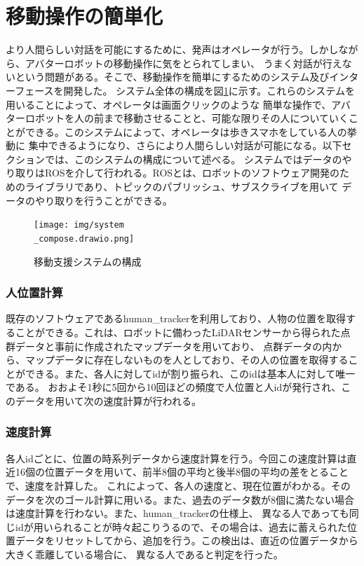 \documentclass[11pt,a4j]{jreport}
\begin{document}
\section{移動操作の簡単化}
より人間らしい対話を可能にするために、発声はオペレータが行う。しかしながら、アバターロボットの移動操作に気をとられてしまい、
うまく対話が行えないという問題がある。そこで、移動操作を簡単にするためのシステム及びインターフェースを開発した。
システム全体の構成を図\ref{pic:systemcompose}に示す。これらのシステムを用いることによって、オペレータは画面クリックのような
簡単な操作で、アバターロボットを人の前まで移動させることと、可能な限りその人についていくことができる。このシステムによって、オペレータは歩きスマホをしている人の挙動に
集中できるようになり、さらにより人間らしい対話が可能になる。以下セクションでは、このシステムの構成について述べる。
システムではデータのやり取りはROSを介して行われる。ROSとは、ロボットのソフトウェア開発のためのライブラリであり、トピックのパブリッシュ、サブスクライブを用いて
データのやり取りを行うことができる。
\begin{figure}[H]
  
  \texttt{[image: img/system\\\_compose.drawio.png]}
  \caption{移動支援システムの構成}
  \label{pic:systemcompose}

\end{figure}


\subsubsection{人位置計算}
既存のソフトウェアであるhuman\_trackerを利用しており、人物の位置を取得することができる。これは、ロボットに備わったLiDARセンサーから得られた点群データと事前に作成されたマップデータを用いており、
点群データの内から、マップデータに存在しないものを人としており、その人の位置を取得することができる。また、各人に対してidが割り振られ、このidは基本人に対して唯一である。
おおよそ1秒に5回から10回ほどの頻度で人位置と人idが発行され、このデータを用いて次の速度計算が行われる。

\subsubsection{速度計算}
各人idごとに、位置の時系列データから速度計算を行う。今回この速度計算は直近16個の位置データを用いて、前半8個の平均と後半8個の平均の差をとることで、速度を計算した。
これによって、各人の速度と、現在位置がわかる。そのデータを次のゴール計算に用いる。また、過去のデータ数が8個に満たない場合は速度計算を行わない。また、human\_trackerの仕様上、
異なる人であっても同じidが用いられることが時々起こりうるので、その場合は、過去に蓄えられた位置データをリセットしてから、追加を行う。この検出は、直近の位置データから大きく乖離している場合に、
異なる人であると判定を行った。
\end{document}
